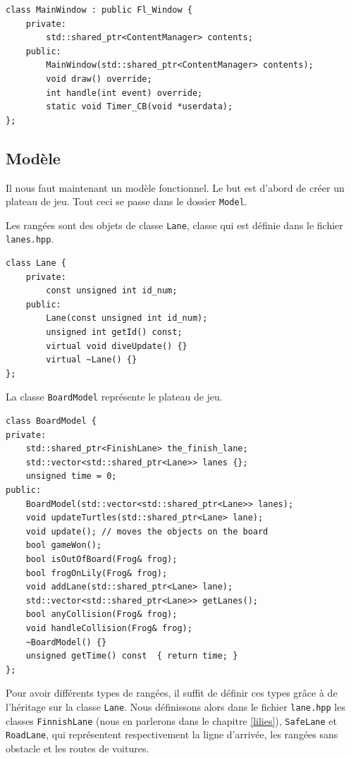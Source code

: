 \documentclass[a4paper, 12pt]{article}
\begin{document}
\begin{lstlisting}
class MainWindow : public Fl_Window {
    private:
        std::shared_ptr<ContentManager> contents;
    public:
        MainWindow(std::shared_ptr<ContentManager> contents);
        void draw() override;
        int handle(int event) override;
        static void Timer_CB(void *userdata);
};
\end{lstlisting}

\subsection{Modèle}

Il nous faut maintenant un modèle fonctionnel. 
Le but est d'abord de créer un plateau de jeu.
Tout ceci se passe dans le dossier \texttt{Model}.

Les rangées sont des objets de classe \texttt{Lane}, 
classe qui est définie dans le fichier \texttt{lanes.hpp}.

\begin{lstlisting}
class Lane {
    private:
        const unsigned int id_num;
    public:
        Lane(const unsigned int id_num);
        unsigned int getId() const;
        virtual void diveUpdate() {}
        virtual ~Lane() {}
};  
\end{lstlisting}

La classe \texttt{BoardModel} représente le plateau de jeu.

\begin{lstlisting}
class BoardModel {
private:
    std::shared_ptr<FinishLane> the_finish_lane;
    std::vector<std::shared_ptr<Lane>> lanes {};
    unsigned time = 0;
public:
    BoardModel(std::vector<std::shared_ptr<Lane>> lanes);
    void updateTurtles(std::shared_ptr<Lane> lane);
    void update(); // moves the objects on the board
    bool gameWon();
    bool isOutOfBoard(Frog& frog);
    bool frogOnLily(Frog& frog);
    void addLane(std::shared_ptr<Lane> lane);
    std::vector<std::shared_ptr<Lane>> getLanes();
    bool anyCollision(Frog& frog);
    void handleCollision(Frog& frog);
    ~BoardModel() {}
    unsigned getTime() const  { return time; }
};
\end{lstlisting}

Pour avoir différents types de rangées, 
il suffit de définir ces types grâce à de l'héritage sur la classe \texttt{Lane}. 
Nous définissons alors dans le fichier \texttt{lane.hpp} 
les classes \texttt{FinnishLane} (nous en parlerons dans le chapitre \ref{lilies}), 
\texttt{SafeLane} et \texttt{RoadLane}, qui représentent respectivement 
la ligne d'arrivée, 
les rangées sans obstacle
et les routes de voitures.
\end{document}
